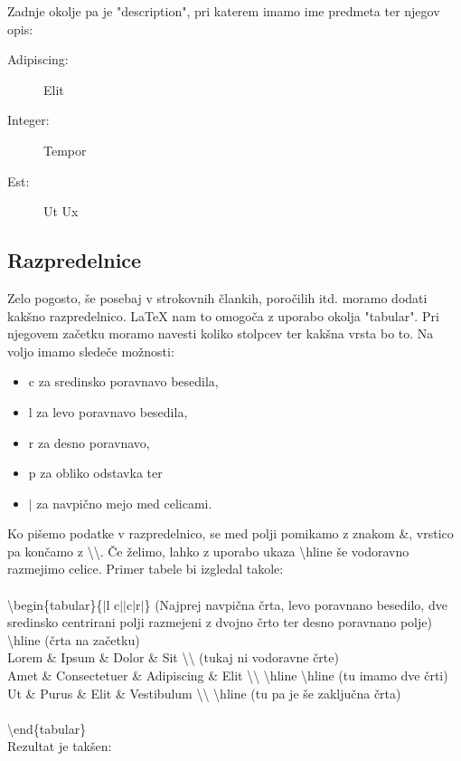 \documentclass[a4paper]{book}
\newcommand\tbs{\textbackslash{}}
\begin{document}
Zadnje okolje pa je "description", pri katerem imamo ime predmeta ter njegov opis:
\begin{description}
\item[Adipiscing:] Elit
\item[Integer:] Tempor
\item[Est:] Ut Ux
\end{description}

\subsection{Razpredelnice}

Zelo pogosto, še posebaj v strokovnih člankih, poročilih itd. moramo dodati kakšno razpredelnico. \LaTeX{} nam to omogoča z uporabo okolja "tabular". 
Pri njegovem začetku moramo navesti koliko stolpcev ter kakšna vrsta bo to. Na voljo imamo sledeče možnosti:
\begin{itemize}
\item c za sredinsko poravnavo besedila,
\item l za levo poravnavo besedila,
\item r za desno poravnavo,
\item p za obliko odstavka ter
\item $|$ za navpično mejo med celicami.
\end{itemize}

Ko pišemo podatke v razpredelnico, se med polji pomikamo z znakom \&{}, vrstico pa končamo z \tbs\tbs. Če želimo, lahko z uporabo ukaza \tbs{}hline še vodoravno razmejimo celice.
Primer tabele bi izgledal takole:\\ \\
\tbs{}begin\{tabular\}\{$|$l c$||$c$|$r$|$\} (Najprej navpična črta, levo poravnano besedilo, dve sredinsko centrirani polji razmejeni z dvojno črto ter desno poravnano polje)\\
\tbs{}hline (črta na začetku)\\
Lorem \& Ipsum \& Dolor \& Sit \tbs{}\tbs{} (tukaj ni vodoravne črte)\\
Amet \& Consectetuer \& Adipiscing \& Elit \tbs{}\tbs{} \tbs{}hline \tbs{}hline (tu imamo dve črti)\\
Ut \& Purus \& Elit \& Vestibulum \tbs{}\tbs{} \tbs{}hline (tu pa je še zaključna črta)\\\\
\tbs{}end\{tabular\}\\


Rezultat je takšen:\\
\end{document}
